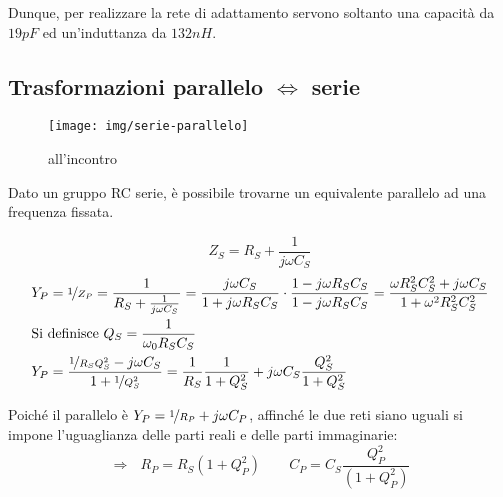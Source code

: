 Dunque, per realizzare la rete di adattamento servono soltanto una capacità da $19pF$ ed un'induttanza da $132nH$.

\subsection{Trasformazioni parallelo $\Leftrightarrow$ serie}

\begin{figure}[h!]
	\centering
	\texttt{[image: img/serie-parallelo]}
	\caption{all'incontro}
	\label{fig:serie-parallelo}
\end{figure}

Dato un gruppo RC serie, è possibile trovarne un equivalente parallelo ad una frequenza fissata.

\[Z_S = {R_S} + \frac{1}{j \omega C_S}\]
\begin{align*}
& Y_P  = \nicefrac{1}{Z_P} =
\frac{1}{R_S + \frac{1}{j \omega C_S}} =
\frac{j \omega C_S}{1+j\omega R_S C_S}
\cdot
\frac{1-j\omega R_S C_S}{1-j\omega R_S C_S}
=
\frac{\omega R_S^2 C_S^2 + j\omega C_S}{1 + \omega^2 R_S^2 C_S^2}
\\
&\mbox{Si definisce } Q_S = \frac{1}{\omega_0 R_S C_S}
\\
&Y_P = \frac{\nicefrac{1}{R_S Q_S^2} - j\omega C_S}{1 + \nicefrac{1}{Q_S^2}}
= \frac{1}{R_S} \frac{1}{1+Q_S^2}
+ j \omega C_S \frac{Q_S^2}{1+Q_S^2}
\end{align*}

Poiché il parallelo è $Y_P = \nicefrac{1}{R_P} + j\omega C_P$, affinché le due reti siano uguali si impone l'uguaglianza delle parti reali e delle parti immaginarie:
\begin{equation}
\Rightarrow ~~~ R_P = R_S (1+Q_P^2)
\qquad
C_P = C_S \frac{Q_P^2}{(1+Q_P^2)}
\end{equation}